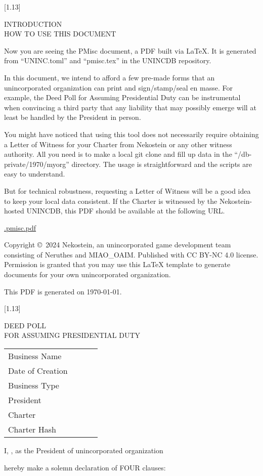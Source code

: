 \documentclass[10pt,a4paper,hidelinks]{article}
\newcommand{\newdochere}[1]{
    \setcounter{page}{1}
    \setcounter{section}{0}
    \scalebox{1}[1.13]{%
        \parbox{\textwidth}{%
            \begin{center}%
                \large\rmfamily\mdseries\strut%
                #1%
            \end{center}%
        }%
    }%
    \par
}
\newcommand{\stdorginfo}[0]{
    \parbox{\linewidth}{
        \tabcolsep=0pt
        \small
        \begin{tabu}{lX}
            \toprule
            \mdseries Business Name~~~~~~ & \fulltomldataATfullname \\
            \mdseries Date of Creation & \fulltomldataATdatecreation \\
            \mdseries Business Type & \fulltomldataATtype \\
            \mdseries President & \fulltomldataATpresident \\
            \mdseries Charter & \uninctomldataATwitnessFIRST \\
            \mdseries Charter Hash & \fulltomldataATcharterhash \\
            \bottomrule
        \end{tabu}
    }\par\vskip 14pt
}
\begin{document}
\newdochere{INTRODUCTION\\HOW TO USE THIS DOCUMENT}
\thispagestyle{empty}

Now you are seeing the PMisc document, a PDF built via \LaTeX.
It is generated from ``UNINC.toml'' and ``pmisc.tex'' in the UNINCDB repository.

In this document, we intend to afford a few pre-made forms
that an unincorporated organization can print and sign/stamp/seal en masse.
For example, the Deed Poll for Assuming Presidential Duty can be instrumental
when convincing a third party that any liability that may possibly emerge
will at least be handled by the President in person.

You might have noticed that using this tool does not necessarily require obtaining a Letter of Witness
for your Charter from Nekostein or any other witness authority.
All you need is to make a local git clone and fill up data in the ``/db-private/1970/myorg'' directory.
The usage is straightforward and the scripts are easy to understand.

But for technical robustness, requesting a Letter of Witness will be a good idea to keep your local data consistent.
If the Charter is witnessed by the Nekostein-hosted UNINCDB,
this PDF should be available at the following URL.

\begin{center}
    \href{\unincdbaltdocprefix.pmisc.pdf}{\unincdbaltdocprefix.pmisc.pdf}
\end{center}

\vfill
\begingroup\small
Copyright \copyright~2024 Nekostein, an unincorporated game development team consisting of Neruthes and MIAO\_OAIM.
Published with CC BY-NC 4.0 license.
Permission is granted that you may use this \LaTeX{} template to generate documents for your own unincorporated organization.

This PDF is generated on \today.
\endgroup





\clearpage
\newdochere{DEED POLL\\FOR ASSUMING PRESIDENTIAL DUTY}
\thispagestyle{empty}

\stdorginfo

\strut I,
\underline{\fulltomldataATpresident},
as the President of unincorporated organization

\underline{\fulltomldataATfullname}

hereby make a solemn declaration of FOUR clauses:
\end{document}
